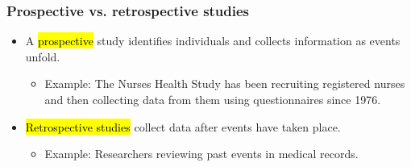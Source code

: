 










\begin{frame}
\frametitle{Prospective vs. retrospective studies}

\begin{itemize}

\item A \hl{prospective} study identifies individuals and collects information as events unfold. 
\begin{itemize}
\item Example: The Nurses Health Study has been recruiting registered nurses and then collecting data from them using questionnaires since 1976.
\end{itemize}

\item \hl{Retrospective studies} collect data after events have taken place.
\begin{itemize}
\item Example: Researchers reviewing past events in medical records.
\end{itemize}

\end{itemize}

\end{frame}

